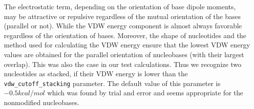 \documentclass[12pt]{article}
\begin{document}
The electrostatic term, depending on the orientation of base dipole moments, may be attractive or repulsive regardless of the mutual orientation of the bases (parallel or not). While the VDW energy component is almost always favorable regardless of the orientation of bases. Moreover, the shape of nucleotides and the method used for calculating the VDW energy ensure that the lowest VDW energy values are obtained for the parallel orientation of nucleobases (with their largest overlap). This was also the case in our test calculations. Thus we recognize two nucleotides as stacked, if their VDW energy is lower than the \texttt{vdw\_cutoff\_stacking} parameter. The default value of this parameter is $ -0.5 kcal/mol$ which was found by trial and error and seems appropriate for the nonmodified nucleobases.

\end{document}
